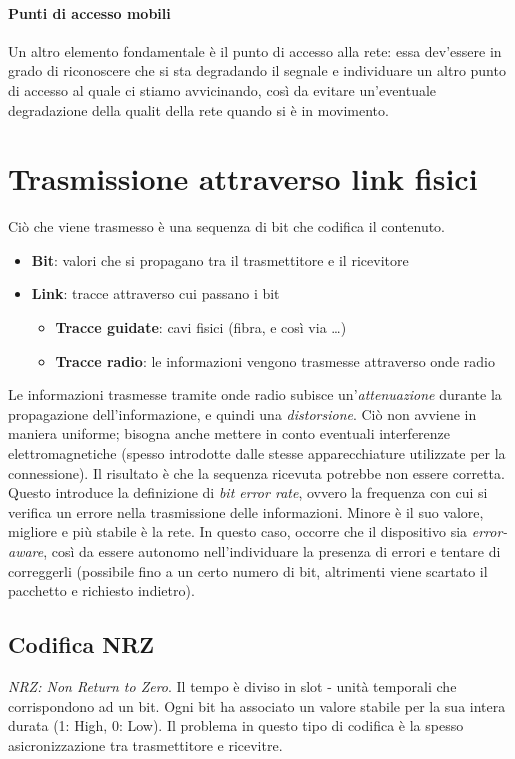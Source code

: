 \paragraph{Punti di accesso mobili}
Un altro elemento fondamentale è il punto di accesso alla rete: essa dev'essere in grado di riconoscere che si sta degradando il segnale e individuare un altro punto di accesso al quale ci stiamo avvicinando, così da evitare un'eventuale degradazione della qualit della rete quando si è in movimento.

\section{Trasmissione attraverso link fisici}
Ciò che viene trasmesso è una sequenza di bit che codifica il contenuto.
\begin{itemize}
	\item \textbf{Bit}: valori che si propagano tra il trasmettitore e il ricevitore
	\item \textbf{Link}: tracce attraverso cui passano i bit
	\begin{itemize}
		\item \textbf{Tracce guidate}: cavi fisici (fibra, e così via \ldots)
		\item \textbf{Tracce radio}: le informazioni vengono trasmesse attraverso onde radio
	\end{itemize}
\end{itemize}

Le informazioni trasmesse tramite onde radio subisce un'\textit{attenuazione} durante la propagazione dell'informazione, e quindi una \textit{distorsione}.
Ciò non avviene in maniera uniforme; bisogna anche mettere in conto eventuali interferenze elettromagnetiche (spesso introdotte dalle stesse apparecchiature utilizzate per la connessione). Il risultato è che la sequenza ricevuta potrebbe non essere corretta. Questo introduce la definizione di \textit{bit error rate}, ovvero la frequenza con cui si verifica un errore nella trasmissione delle informazioni. Minore è il suo valore, migliore e più stabile è la rete.
In questo caso, occorre che il dispositivo sia \textit{error-aware}, così da essere autonomo nell'individuare la presenza di errori e tentare di correggerli (possibile fino a un certo numero di bit, altrimenti viene scartato il pacchetto e richiesto indietro).

\subsection{Codifica NRZ}
\textit{NRZ: Non Return to Zero}. Il tempo è diviso in slot - unità temporali che corrispondono ad un bit.
Ogni bit ha associato un valore stabile per la sua intera durata (1: High, 0: Low).
Il problema in questo tipo di codifica è la spesso asicronizzazione tra trasmettitore e ricevitre.

